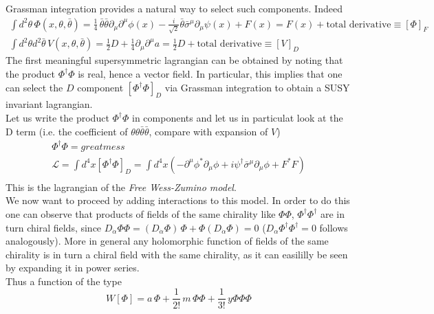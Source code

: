 \documentclass[12pt]{article}
\begin{document}
\newpage

Grassman integration provides a natural way to select such components. Indeed 
\begin{gather*}
  \int d^2\theta \, \Phi(x, \theta, \bar\theta) = \frac{1}{4} \, \bar\theta \bar\theta \partial_\mu \partial^\mu \phi(x) - \frac{i}{\sqrt{2}} \bar\theta \bar\sigma^\mu \partial_\mu \psi(x) + F(x) = F(x) + \text{total derivative} \equiv \left[\Phi\right]_F \\
  \int d^2\theta d^2\bar\theta \, V(x, \theta, \bar\theta) = \frac{1}{2} D + \frac{1}{4} \partial_\mu \partial^\mu a = \frac{1}{2} D + \text{total derivative} \equiv \left[V\right]_D
\end{gather*}
The first meaningful supersymmetric lagrangian can be obtained by noting that the product $\Phi^\dagger\Phi$ is real, hence a vector field. In particular, this implies that one can select the $D$ component $\left[\Phi^\dagger\Phi\right]_D$ via Grassman integration to obtain a SUSY invariant lagrangian. \\
Let us write the product $\Phi^\dagger\Phi$ in components and let us in particulat look at the D term (i.e. the coefficient of $\theta\theta\bar\theta\bar\theta$, compare with expansion of $V$)
\begin{gather*}
  \Phi^\dagger\Phi = great mess \\
  \boxed{\mathcal{L} = \int d^4 x \left[\Phi^\dagger\Phi\right]_D = \int d^4 x \left( -\partial^\mu \phi^* \partial_\mu \phi + i \psi^\dagger \bar\sigma^\mu \partial_\mu \phi + F^*F \right)} \\
\end{gather*}
This is the lagrangian of the \emph{Free Wess-Zumino model}. \\
We now want to proceed by adding interactions to this model. In order to do this one can observe that products of fields of the same chirality like $\Phi\Phi$, $\Phi^\dagger\Phi^\dagger$ are in turn chiral fields, since 
$D_{\dot\alpha} \Phi\Phi = (D_{\dot\alpha} \Phi) \, \Phi + \Phi (D_{\dot\alpha} \Phi) = 0$ ($D_\alpha \Phi^\dagger\Phi^\dagger=0$ follows analogously). More in general any holomorphic function of fields of the same chirality is in turn a chiral field with the same chirality, as it can easililly be seen by expanding it in power series. \\
Thus a function of the type
\begin{equation}
  W[\Phi] = a \, \Phi + \frac{1}{2!} \, m \, \Phi\Phi + \frac{1}{3!} \, y \Phi \Phi \Phi
  \label{eq:superpotential}
\end{equation}
\end{document}
